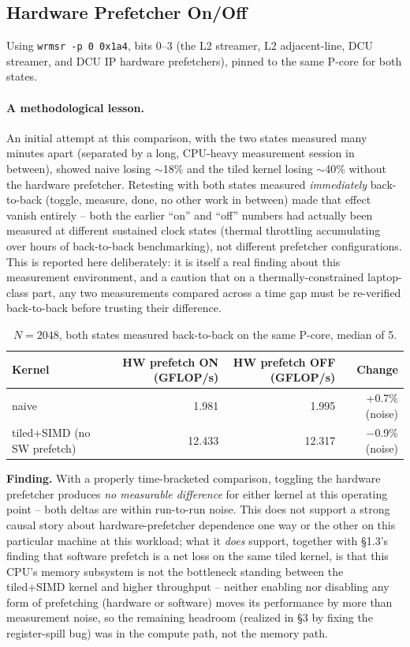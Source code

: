 \documentclass[11pt]{article}
\begin{document}
\subsection{Hardware Prefetcher On/Off}
\label{sec:hwpf}

Using \texttt{wrmsr -p 0 0x1a4}, bits 0--3 (the L2 streamer, L2 adjacent-line, DCU
streamer, and DCU IP hardware prefetchers), pinned to the same P-core for both states.

\paragraph{A methodological lesson.} An initial attempt at this comparison, with the two
states measured many minutes apart (separated by a long, CPU-heavy measurement session
in between), showed naive losing $\sim$18\% and the tiled kernel losing $\sim$40\%
without the hardware prefetcher. Retesting with both states measured \emph{immediately}
back-to-back (toggle, measure, done, no other work in between) made that effect vanish
entirely -- both the earlier ``on'' and ``off'' numbers had actually been measured at
different sustained clock states (thermal throttling accumulating over hours of
back-to-back benchmarking), not different prefetcher configurations. This is reported
here deliberately: it is itself a real finding about this measurement environment, and a
caution that on a thermally-constrained laptop-class part, any two measurements compared
across a time gap must be re-verified back-to-back before trusting their difference.

\begin{table}[h]
\centering
\begin{tabular}{l r r r}
\toprule
Kernel & {HW prefetch ON (GFLOP/s)} & {HW prefetch OFF (GFLOP/s)} & {Change} \\
\midrule
naive               & 1.981  & 1.995  & +0.7\% (noise) \\
tiled+SIMD (no SW prefetch) & 12.433 & 12.317 & $-$0.9\% (noise) \\
\bottomrule
\end{tabular}
\caption{$N{=}2048$, both states measured back-to-back on the same P-core, median of 5.}
\end{table}

\textbf{Finding.} With a properly time-bracketed comparison, toggling the hardware
prefetcher produces \emph{no measurable difference} for either kernel at this operating
point -- both deltas are within run-to-run noise. This does not support a strong causal
story about hardware-prefetcher dependence one way or the other on this particular
machine at this workload; what it \emph{does} support, together with \S1.3's finding that
software prefetch is a net loss on the same tiled kernel, is that this CPU's memory
subsystem is not the bottleneck standing between the tiled+SIMD kernel and higher
throughput -- neither enabling nor disabling any form of prefetching (hardware or
software) moves its performance by more than measurement noise, so the remaining
headroom (realized in \S3 by fixing the register-spill bug) was in the compute path, not
the memory path.
\end{document}
